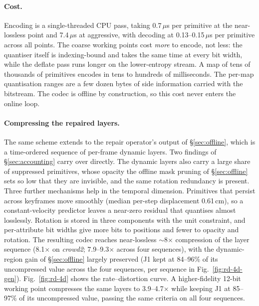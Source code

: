 \documentclass[10pt,twocolumn,letterpaper]{article}
\newcommand{\gate}[1]{{#1}} %
\begin{document}
\paragraph{Cost.}
Encoding is a single-threaded CPU pass, taking \gate{0.7}\,$\mu$s per primitive at the
near-lossless point and \gate{7.4}\,$\mu$s at aggressive, with decoding at
\gate{0.13--0.15}\,$\mu$s per primitive across all points. %
The coarse working points cost \emph{more} to encode, not less: the quantiser itself is
indexing-bound and takes the same time at every bit width, while the deflate pass runs
longer on the lower-entropy stream. A map of tens of thousands of primitives encodes in
tens to hundreds of milliseconds. The per-map quantisation ranges are a few dozen bytes
of side information carried with the bitstream. The codec is offline by construction, so
this cost never enters the online loop.

\paragraph{Compressing the repaired layers.}
The same scheme extends to the repair operator's output of \S\ref{sec:offline},
which is a time-ordered sequence of per-frame dynamic layers. Two findings of \S\ref{sec:accounting}
carry over directly. The dynamic layers also carry a large share of suppressed primitives, whose
opacity the offline mask pruning of \S\ref{sec:offline} sets so low that they are invisible, and the
same rotation redundancy is present. Three further mechanisms help in the temporal
dimension. Primitives that persist across keyframes move smoothly (median per-step
displacement \gate{0.61}\,cm), so a constant-velocity predictor leaves a near-zero
residual that quantises almost losslessly. %
Rotation is stored in three components
with the unit constraint, and per-attribute bit widths give more bits to positions
and fewer to opacity and rotation. The resulting codec reaches near-lossless
\gate{$\sim$8$\times$} compression of the layer sequence (\gate{8.1$\times$} on
\emph{crowd2}; \gate{7.9--9.3$\times$} across four sequences), with the dynamic-region
gain of \S\ref{sec:offline} largely preserved (J1 kept at \gate{84--96\%} of its
uncompressed value across the four sequences, per sequence in
Fig.~\ref{fig:rd-4d-gen}). %
Fig.~\ref{fig:rd-4d} shows the rate--distortion curve.
A higher-fidelity 12-bit working point compresses the same layers to
\gate{3.9--4.7$\times$} while keeping J1 at \gate{85--97\%} of its uncompressed
value, passing the same criteria on all four sequences. %
\end{document}
